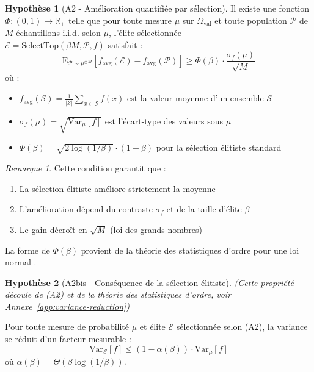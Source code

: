 \documentclass[12pt,a4paper]{article}
\theoremstyle{definition}
\newtheorem{hypothesis}{Hypothèse}
\theoremstyle{remark}
\newtheorem{remark}[theorem]{Remarque}
\newcommand{\R}{\mathbb{R}}
\newcommand{\E}{\text{E}}
\newcommand{\Var}{\text{Var}}
\begin{document}
	\begin{hypothesis}[A2 - Amélioration quantifiée par sélection]\label{hyp:A2}
		Il existe une fonction $\Phi : (0,1) \to \R_+$ telle que pour toute mesure  $\mu$ sur $\Omega_{\text{val}}$ et toute population $\mathcal{P}$ de $M$ échantillons i.i.d. selon $\mu$, l'élite sélectionnée\\ $\mathcal{E} = \text{SelectTop}(\beta M, \mathcal{P}, f)$ satisfait :
		\begin{equation}
			\E_{\mathcal{P}\sim\mu^{\otimes M}}[f_{\text{avg}}(\mathcal{E}) - f_{\text{avg}}(\mathcal{P})] \geq \Phi(\beta) \cdot \frac{\sigma_f(\mu)}{\sqrt{M}}
		\end{equation}
		où :
		\begin{itemize}
			\item $f_{\text{avg}}(\mathcal{S}) = \frac{1}{|\mathcal{S}|}\sum_{x\in\mathcal{S}} f(x)$ est la valeur moyenne d'un ensemble $\mathcal{S}$
			\item $\sigma_f(\mu) = \sqrt{\Var_\mu[f]}$ est l'écart-type des valeurs sous $\mu$
			\item $\Phi(\beta) = \sqrt{2\log(1/\beta)} \cdot (1-\beta)$ pour la sélection élitiste standard
		\end{itemize}
	\end{hypothesis}
	
	\begin{remark}
		Cette condition garantit que :
		\begin{enumerate}
			\item La sélection élitiste améliore strictement la moyenne
			\item L'amélioration dépend du contraste $\sigma_f$ et de la taille d'élite $\beta$
			\item Le gain décroît en $\sqrt{M}$ (loi des grands nombres)
		\end{enumerate}
		La forme de $\Phi(\beta)$ provient de la théorie des statistiques d'ordre pour une loi normal \cite{david2003order}.
	\end{remark}
	
	\begin{hypothesis}[A2bis - Conséquence de la sélection élitiste]\label{hyp:A2bis}
    \emph{(Cette propriété découle de (A2) et de la théorie des statistiques 
    d'ordre, voir Annexe~\ref{app:variance-reduction})}
    
    Pour toute mesure de probabilité $\mu$ et élite $\mathcal{E}$ sélectionnée selon (A2),
    la variance se réduit d'un facteur mesurable :
    \begin{equation}
        \Var_{\mathcal{E}}[f] \leq (1-\alpha(\beta)) \cdot \Var_\mu[f]
    \end{equation}
    où $\alpha(\beta) = \Theta(\beta \log(1/\beta))$.
    \end{hypothesis}
\end{document}
